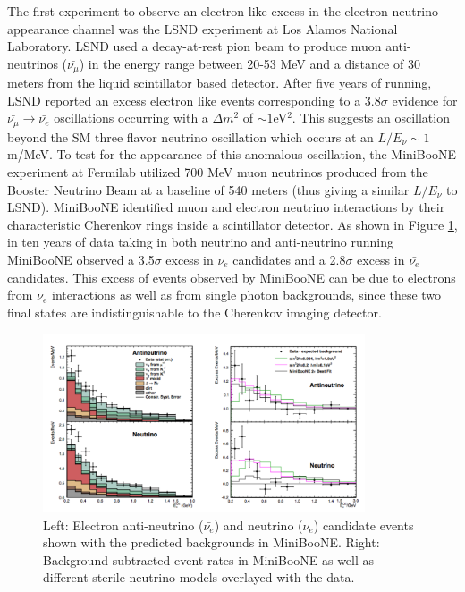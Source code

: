 The first experiment to observe an electron-like excess in the electron neutrino appearance channel was the LSND experiment \cite{No16} at Los Alamos National Laboratory. LSND used a decay-at-rest pion beam to produce muon anti-neutrinos ($\bar{\nu_{\mu}}$) in the energy range between 20-53 MeV and a distance of 30 meters from the liquid scintillator based detector. After five years of running, LSND reported an excess electron like events corresponding to a 3.8$\sigma$ evidence for $\bar{\nu_{\mu}} \rightarrow \bar{\nu_{e}}$ oscillations occurring with a $\Delta m^{2}$ of $\sim 1$eV$^{2}$. This suggests an oscillation beyond the SM three flavor neutrino oscillation which occurs at an $L/E_{\nu} \sim 1$m/MeV. To test for the appearance of this anomalous oscillation, the MiniBooNE experiment \cite{No17} at Fermilab utilized 700 MeV muon neutrinos produced from the Booster Neutrino Beam at a baseline of 540 meters (thus giving a similar $L/E_{\nu}$ to LSND). MiniBooNE identified muon and electron neutrino interactions by their characteristic Cherenkov rings inside a scintillator detector. As shown in Figure \ref{fig:minibooneExcess}, in ten years of data taking in both neutrino and anti-neutrino running MiniBooNE observed a 3.5$\sigma$ excess in $\nu_{e}$ candidates and a 2.8$\sigma$ excess in $\bar{\nu_{e}}$ candidates. This excess of events observed by MiniBooNE can be due to electrons from $\nu_{e}$ interactions as well as from single photon backgrounds, since these two final states are indistinguishable to the Cherenkov imaging detector.

\begin{figure}[htb]
\centering
\includegraphics[width=0.85\textwidth]{images/minibooneExcess.png}
\caption[]{Left: Electron anti-neutrino ($\bar{\nu_{e}}$) and neutrino ($\nu_{e}$) candidate events shown with the predicted backgrounds in MiniBooNE. Right: Background subtracted event rates in MiniBooNE as well as different sterile neutrino models overlayed with the data.}
\label{fig:minibooneExcess}
\end{figure}


